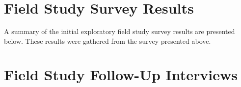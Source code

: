 \begin{center}
\end{center}

\chapter{Field Study Survey Results}
\label{appendix:field-study-survey-results}

A summary of the initial exploratory field study survey results are presented below. These results were gathered from the survey presented above.

\chapter{Field Study Follow-Up Interviews}
\label{appendix:field-study-follow-up-interviews}

